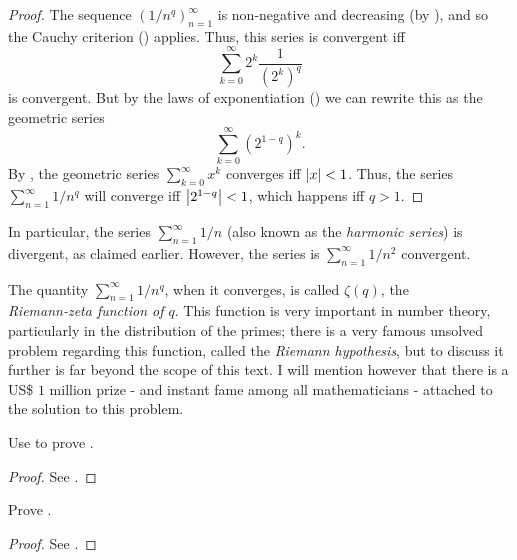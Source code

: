 \begin{proof}
  The sequence \((1 / n^q)_{n = 1}^\infty\) is non-negative and decreasing (by ), and so the Cauchy criterion () applies.
  Thus, this series is convergent iff
  \[
    \sum_{k = 0}^\infty 2^k \dfrac{1}{(2^k)^q}
  \]
  is convergent.
  But by the laws of exponentiation () we can rewrite this as the geometric series
  \[
    \sum_{k = 0}^\infty (2^{1 - q})^k.
  \]
  By , the geometric series \(\sum_{k = 0}^\infty x^k\) converges iff \(\left\lvert x\right\rvert < 1\).
  Thus, the series \(\sum_{n = 1}^\infty 1 / n^q\) will converge iff \(\left\lvert2^{1 - q}\right\rvert < 1\), which happens iff \(q > 1\).
\end{proof}

\begin{note}
  In particular, the series \(\sum_{n = 1}^\infty 1 / n\) (also known as the \emph{harmonic series}) is divergent, as claimed earlier.
  However, the series is \(\sum_{n = 1}^\infty 1 / n^2\) convergent.
\end{note}

\begin{rmk}\label{i:7.3.8}
  The quantity \(\sum_{n = 1}^\infty 1 / n^q\), when it converges, is called \(\zeta(q)\), the \\
  \emph{Riemann-zeta function of \(q\)}.
  This function is very important in number theory, particularly in the distribution of the primes;
  there is a very famous unsolved problem regarding this function, called the \emph{Riemann hypothesis}, but to discuss it further is far beyond the scope of this text.
  I will mention however that there is a US\$ \(1\) million prize
  - and instant fame among all mathematicians -
  attached to the solution to this problem.
\end{rmk}

\exercisesection

\begin{ex}\label{i:ex:7.3.1}
  Use  to prove .
\end{ex}

\begin{proof}
  See .
\end{proof}

\begin{ex}\label{i:ex:7.3.2}
  Prove .
\end{ex}

\begin{proof}
  See .
\end{proof}

